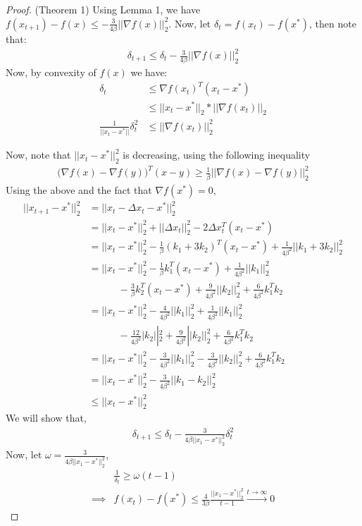 \begin{proof}(Theorem 1)
Using Lemma 1, we have $f(x_{t+1}) - f(x) \leq -\frac{3}{4\beta}|| \nabla f(x) ||_2^2 $. Now, let $\delta_t = f(x_t) - f(x^*)$, then note that:
\begin{align*}
\delta_{t+1} \leq \delta_t - \frac{3}{4\beta}|| \nabla f(x) ||_2^2
\end{align*}
Now, by convexity of $f(x)$ we have:
\begin{align}
\delta_t &\leq \nabla f(x_t)^T (x_t - x^*) \\
 &\leq || x_t - x^* ||_2 * || \nabla f(x_t) ||_2 \\
\frac{1}{|| x_t - x^* || }\delta_t^2 & \leq  || \nabla f(x_t) ||_2^2
\end{align}

Now, note that $|| x_t - x^*||_2^2$ is decreasing, using the following inequality
\begin{align*}
\big( \nabla f(x) - \nabla f(y)  \big)^T(x-y)  \geq \frac{1}{\beta} || \nabla f(x) - \nabla f(y) ||_2^2
\end{align*}
Using the above and the fact that $\nabla f(x^*) = 0$,
\begin{align*}
|| x_{t+1} - x^* ||_2^2 &= || x_t - \Delta x_t - x^* ||_2^2 \\
&= || x_t - x^* ||_2^2 + || \Delta x_t ||_2^2 - 2 \Delta x_t^T(x_t - x^*) \\
&= || x_t - x^* ||_2^2 - \frac{1}{\beta}(k_1 + 3k_2)^T (x_t - x^*) + \frac{1}{4 \beta^2}|| k_1 + 3k_2 ||_2^2 \\
&= || x_t - x^* ||_2^2 - \frac{1}{ \beta}k_1^T (x_t - x^*) + \frac{1}{4 \beta^2}|| k_1 ||_2^2  \\
& \quad \quad \quad - \frac{3}{\beta}k_2^T (x_t - x^*) + \frac{9}{4 \beta^2}|| k_2 ||_2^2 + \frac{6}{4 \beta^2} k_1 ^T k_2 \\
&= || x_t - x^* ||_2^2 - \frac{4}{4 \beta^2}||k_1 ||_2^2 + \frac{1}{4 \beta^2}|| k_1 ||_2^2  \\
& \quad \quad \quad - \frac{12}{4 \beta^2}|k_2||_2^2 + \frac{9}{4 \beta^2}|| k_2 ||_2^2 + \frac{6}{4 \beta^2} k_1 ^T k_2 \\
&= || x_t - x^* ||_2^2 - \frac{3}{4 \beta^2}||k_1||_2^2 - \frac{3}{4 \beta^2}||k_2||_2^2 + \frac{6}{4 \beta^2} k_1 ^T k_2 \\
&= || x_t - x^* ||_2^2 -  \frac{3}{4 \beta^2}|| k_1 - k_2||_2^2  \\
& \leq || x_t - x^* ||_2^2
\end{align*}
We will show that,
\begin{align}
\delta_{t+1} \leq \delta_t - \frac{3}{4 \beta || x_1 - x^* ||_2^2} \delta_t^2
\end{align}
Now, let $\omega = \frac{3}{4 \beta   || x_1 - x^* ||_2^2}$, %
\begin{align*}
& \frac{1}{\delta_t} \geq \omega (t-1) \\
\implies & f(x_t) - f(x^*) \leq \frac{4}{3 \beta} \frac{ || x_1 - x^* ||_2^2}{t-1} \xrightarrow{t \to \infty} 0
\end{align*}
\end{proof}

